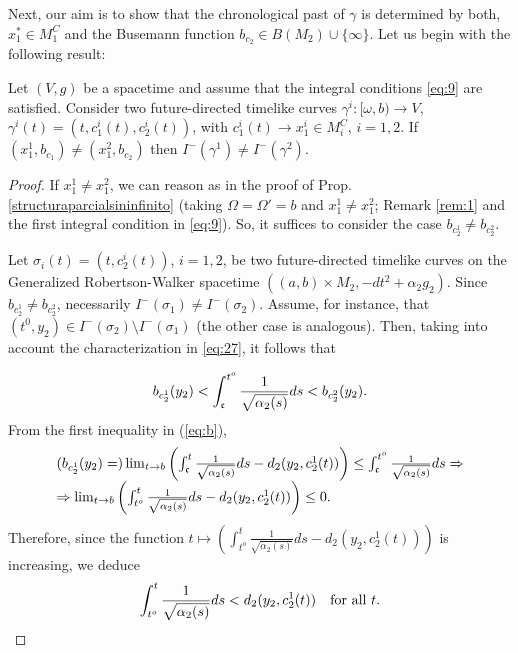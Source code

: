 Next, our aim is to show that the chronological past of $\gamma$ is determined by both, $x_1^*\in M_1^C$ and the Busemann function $b_{c_2}\in B(M_2)\cup \{\infty\}$. Let us begin with the following result:
\begin{prop}\label{prop:conddiferbordedif}
  Let $(V,g)$ be a {\multiwarped} spacetime and assume that the integral conditions \eqref{eq:9} are satisfied. Consider two future-directed timelike curves $\gamma^i:[\omega,b)\rightarrow V$, $\gamma^i(t)=(t,c_1^i(t),c_2^i(t))$, with $c_1^i(t)\rightarrow x_1^i\in M_i^C$, $i=1,2$. If $(x_1^1,b_{c_1})\neq (x_1^2,b_{c_2})$ then $I^-(\gamma^1)\neq I^-(\gamma^2)$.
\end{prop}
\begin{proof} If $x_1^1\neq x_1^2$, we can reason as in the proof of Prop. \ref{structuraparcialsininfinito} (taking $\Omega=\Omega'=b$ and $x_1^1\neq x_1^2$; Remark \ref{rem:1} and the first integral condition in \eqref{eq:9}). So, it suffices to consider the case $b_{c_2^1}\neq b_{c_2^2}$.

Let $\sigma_i(t)=(t,c_2^i(t))$, $i=1,2$, be two future-directed timelike curves on the Generalized Robertson-Walker spacetime $\left( (a,b)\times M_2,-dt^2+\alpha_2 g_2\right)$. Since $b_{c_2^1}\neq b_{c_2^2}$, necessarily $I^{-}(\sigma_1)\neq I^{-}(\sigma_2)$. Assume, for instance, that  $(t^0,y_2)\in I^{-}(\sigma_2)\setminus I^{-}(\sigma_1)$ (the other case is analogous). Then, taking into account the characterization in \eqref{eq:27}, it follows that

  \begin{equation}\label{eq:b}
b_{c_2^1}(y_2)<\int_{\mathfrak{c}}^{t^o}\frac{1}{\sqrt{\alpha_2(s)}}ds <b_{c_2^2}(y_2).
\end{equation}
From the first inequality in (\ref{eq:b}),
    \[
      \begin{array}{l}
  (b_{c^1_2}(y_2)=)\lim_{t\rightarrow b} \left(\int_{\mathfrak{c}}^{t}\frac{1}{\sqrt{\alpha_2(s)}}ds-d_2(y_2,c_2^1(t))\right)\leq\int_{\mathfrak{c}}^{t^o}\frac{1}{\sqrt{\alpha_2(s)}}ds\Rightarrow\\ \Rightarrow  \lim_{t\rightarrow b}\left( \int_{t^o}^{t}\frac{1}{\sqrt{\alpha_2(s)}}ds-d_2(y_2,c_2^1(t))\right)\leq 0.
     \end{array}
 \]
 Therefore, since the function $t\mapsto \left(\int_{t^o}^{t}\frac{1}{\sqrt{\alpha_2(s)}}ds-d_2(y_2,c_2^1(t))\right)$ is increasing, we deduce
      \begin{equation}\label{b}
\int_{t^o}^{t}\frac{1}{\sqrt{\alpha_2(s)}}ds<d_2(y_2,c_2^1(t))\quad\hbox{for all $t$.}
        \end{equation}


\end{proof}
